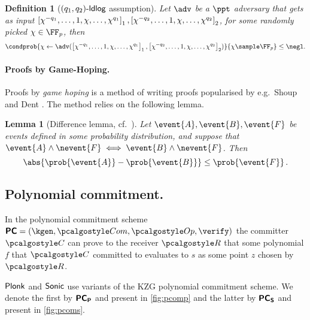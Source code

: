 \let\accentvec\vec \documentclass[runningheads,10pt]{llncs}
\newtheorem{lemma}[theorem]{Lemma}
\newtheorem{definition}[theorem]{Definition}
\begin{document}
\begin{definition}[$(q_1, q_2)\text{-}\mathsf{ldlog}$ assumption]
		Let $\adv$ be a $\ppt$ adversary that gets as input $\left[\chi^{-q_1},
		\ldots, 1, \chi, \ldots, \chi^{q_1}\right]_{1}, \left[\chi^{-q_2}, \ldots, 1, \chi, \ldots, \chi^{q_2}\right]_{2}$, for some randomly picked $\chi \in \FF_p$, then
	\[
			\condprob{\chi \gets \adv(\gone{\chi^{-q_1}, \ldots, 1, \chi, \ldots,
			\chi^{q_1}}, \gtwo{\chi^{-q_2}, \ldots, 1, \chi, \ldots, \chi^{q_2} })}{\chi \sample \FF_p} \leq \negl.
	\]
\end{definition}

\paragraph{Proofs by Game-Hoping.}
Proofs by \emph{game hoping} is a method of writing proofs popularised by e.g.~Shoup \cite{EPRINT:Shoup04} and Dent \cite{EPRINT:Dent06c}. The method relies on the following lemma.

\begin{lemma}[Difference lemma,  cf.~{\cite[Lemma 1]{EPRINT:Shoup04}}]
	\label{lem:difference_lemma}
	Let $\event{A}, \event{B}, \event{F}$ be events defined in some probability distribution, and suppose that $\event{A} \land \nevent{F} \iff \event{B} \land \nevent{F}$. 
	Then 
	\[
		\abs{\prob{\event{A}} - \prob{\event{B}}} \leq \prob{\event{F}}\,.
	\]
\end{lemma}

\subsection{Polynomial commitment.}
\label{sec:poly_com}
In the polynomial commitment scheme $\PCOM = (\kgen, \com, \open, \verify)$ the committer $\committer$ can prove to the receiver $\receiver$ that some polynomial $f$ that $\committer$ committed to evaluates to $s$ as some point $z$ chosen by $\receiver$.

$\textnormal{\textsf{Plonk}}$ and ${\textnormal{\textsf{Sonic}}}$ use variants of the KZG polynomial commitment scheme. We denote the first by $\bm{\mathsf{PC}}_{\bm{\mathsf{P}}}$ and present in \cref{fig:pcomp} and the latter by $\bm{\mathsf{PC}}_{\bm{\mathsf{S}}}$ and present in \cref{fig:pcoms}.
\end{document}
